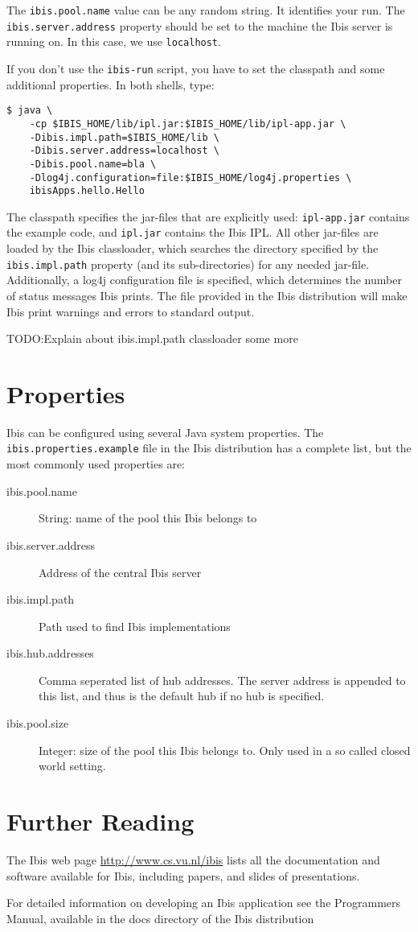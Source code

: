 \documentclass[10pt]{article}
\newcommand{\mysection}[1]{\section{#1}\label{#1}}
\begin{document}
The \texttt{ibis.pool.name} value can be any random string.  It
identifies your run. The \texttt{ibis.server.address} property should be
set to the machine the Ibis server is running on. In this case, we use
\texttt{localhost}.

If you don't use the \texttt{ibis-run} script, you have to set the classpath
and some additional properties. In both shells, type:

\noindent
{\small
\begin{verbatim}
$ java \
    -cp $IBIS_HOME/lib/ipl.jar:$IBIS_HOME/lib/ipl-app.jar \
    -Dibis.impl.path=$IBIS_HOME/lib \
    -Dibis.server.address=localhost \
    -Dibis.pool.name=bla \
    -Dlog4j.configuration=file:$IBIS_HOME/log4j.properties \
    ibisApps.hello.Hello
\end{verbatim}
}
\noindent
The classpath specifies the jar-files that are explicitly used:
\texttt{ipl-app.jar} contains the example code, and \texttt{ipl.jar} contains
the Ibis IPL. All other jar-files are loaded by the Ibis classloader, which
searches the directory specified by the \texttt{ibis.impl.path} property
(and its sub-directories) for any needed jar-file.
Additionally, a log4j configuration file is specified, which determines the
number of status messages Ibis prints. The file provided in the Ibis
distribution will make Ibis print
warnings and errors to standard output.

TODO:Explain about ibis.impl.path classloader some more

\mysection{Properties}

Ibis can be configured using several Java system properties. The
\texttt{ibis.properties.example} file in the Ibis distribution has a complete
list, but the most commonly used properties are:

\begin{description}

\item[ibis.pool.name] String: name of the pool this Ibis belongs to
\item[ibis.server.address] Address of the central Ibis server
\item[ibis.impl.path] Path used to find Ibis implementations
\item[ibis.hub.addresses] Comma seperated list of hub addresses. The
server address is appended to this list, and thus is the default hub if
no hub is specified.
\item[ibis.pool.size] Integer: size of the pool this Ibis belongs to.
Only used in a so called closed world setting.

\end{description}

\mysection{Further Reading}

The Ibis web page \url{http://www.cs.vu.nl/ibis} lists all
the documentation and software available for Ibis, including papers, and
slides of presentations.

For detailed information on developing an Ibis application see the
Programmers Manual, available in the docs directory of the Ibis
distribution
\end{document}
